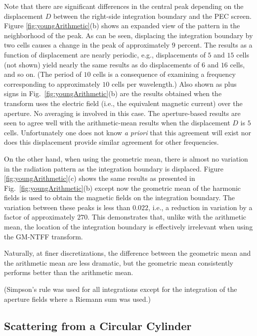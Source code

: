 Note that there are significant differences in the central peak
depending on the displacement $D$ between the right-side integration
boundary and the PEC screen.  Figure \ref{fig:youngArithmetic}(b)
shows an expanded view of the pattern in the neighborhood of the peak.
As can be seen, displacing the integration boundary by two cells
causes a change in the peak of approximately $9$ percent.  The results
as a function of displacement are nearly periodic, e.g., displacements
of $5$ and $15$ cells (not shown) yield nearly the same results as do
displacements of $6$ and $16$ cells, and so on.  (The period of $10$
cells is a consequence of examining a frequency corresponding to
approximately $10$ cells per wavelength.)  Also shown as plus signs in
Fig.\ \ref{fig:youngArithmetic}(b) are the results obtained when the
transform uses the electric field (i.e., the equivalent magnetic
current) over the aperture.  No averaging is involved in this case.
The aperture-based results are seen to agree well with the
arithmetic-mean results when the displacement $D$ is $5$ cells.
Unfortunately one does not know {\em a priori} that this agreement
will exist nor does this displacement provide similar agreement for
other frequencies.

On the other hand, when using the geometric mean, there is almost no
variation in the radiation pattern as the integration boundary is
displaced.  Figure \ref{fig:youngArithmetic}(c) shows the same results
as presented in Fig.\ \ref{fig:youngArithmetic}(b) except now the
geometric mean of the harmonic fields is used to obtain the magnetic
fields on the integration boundary.  The variation between these peaks
is less than $0.022$, i.e., a reduction in variation by a factor of
approximately $270$.  This demonstrates that, unlike with the
arithmetic mean, the location of the integration boundary is
effectively irrelevant when using the GM-NTFF transform.

Naturally, at finer discretizations, the difference between the
geometric mean and the arithmetic mean are less dramatic, but the
geometric mean consistently performs better than the arithmetic mean.

(Simpson's rule was used for all integrations except for the
integration of the aperture fields where a Riemann sum was used.)

\subsection{Scattering from a Circular Cylinder}

